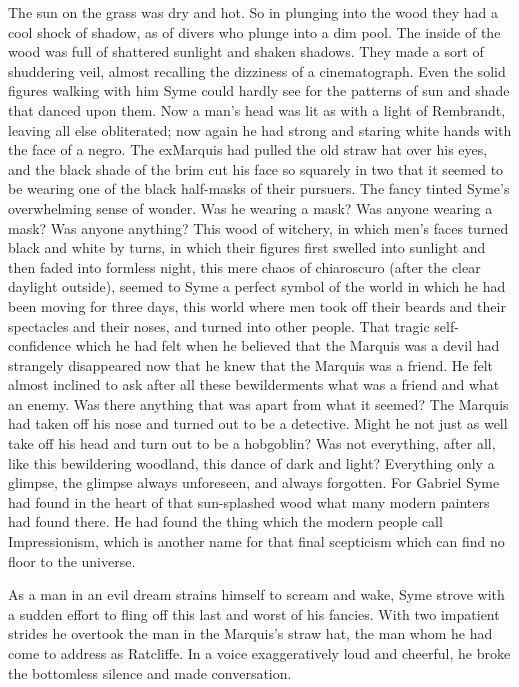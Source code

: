 \documentclass{book}
\begin{document}
The sun on the grass was dry and hot. So in plunging into the wood they had a cool shock of shadow, as of divers who plunge into a dim pool. The inside of the wood was full of shattered sunlight and shaken shadows. They made a sort of shuddering veil, almost recalling the dizziness of a cinematograph. Even the solid figures walking with him Syme could hardly see for the patterns of sun and shade that danced upon them. Now a man’s head was lit as with a light of Rembrandt, leaving all else obliterated; now again he had strong and staring white hands with the face of a negro. The exMarquis had pulled the old straw hat over his eyes, and the black shade of the brim cut his face so squarely in two that it seemed to be wearing one of the black half-masks of their pursuers. The fancy tinted Syme’s overwhelming sense of wonder. Was he wearing a mask? Was anyone wearing a mask? Was anyone anything? This wood of witchery, in which men’s faces turned black and white by turns, in which their figures first swelled into sunlight and then faded into formless night, this mere chaos of chiaroscuro (after the clear daylight outside), seemed to Syme a perfect symbol of the world in which he had been moving for three days, this world where men took off their beards and their spectacles and their noses, and turned into other people. That tragic self-confidence which he had felt when he believed that the Marquis was a devil had strangely disappeared now that he knew that the Marquis was a friend. He felt almost inclined to ask after all these bewilderments what was a friend and what an enemy. Was there anything that was apart from what it seemed? The Marquis had taken off his nose and turned out to be a detective. Might he not just as well take off his head and turn out to be a hobgoblin? Was not everything, after all, like this bewildering woodland, this dance of dark and light? Everything only a glimpse, the glimpse always unforeseen, and always forgotten. For Gabriel Syme had found in the heart of that sun-splashed wood what many modern painters had found there. He had found the thing which the modern people call Impressionism, which is another name for that final scepticism which can find no floor to the universe.

As a man in an evil dream strains himself to scream and wake, Syme strove with a sudden effort to fling off this last and worst of his fancies. With two impatient strides he overtook the man in the Marquis’s straw hat, the man whom he had come to address as Ratcliffe. In a voice exaggeratively loud and cheerful, he broke the bottomless silence and made conversation.
\end{document}
